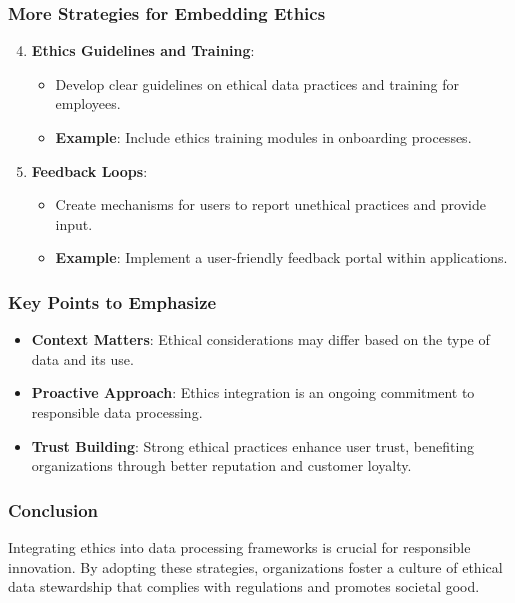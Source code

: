 \documentclass[aspectratio=169]{beamer}
\begin{document}
\begin{frame}[fragile]
    \frametitle{More Strategies for Embedding Ethics}
    \begin{enumerate}
        \setcounter{enumi}{3}
        \item \textbf{Ethics Guidelines and Training}:
            \begin{itemize}
                \item Develop clear guidelines on ethical data practices and training for employees.
                \item \textbf{Example}: Include ethics training modules in onboarding processes.
            \end{itemize}
        \item \textbf{Feedback Loops}:
            \begin{itemize}
                \item Create mechanisms for users to report unethical practices and provide input.
                \item \textbf{Example}: Implement a user-friendly feedback portal within applications.
            \end{itemize}
    \end{enumerate}
\end{frame}

\begin{frame}[fragile]
    \frametitle{Key Points to Emphasize}
    \begin{itemize}
        \item \textbf{Context Matters}: Ethical considerations may differ based on the type of data and its use.
        \item \textbf{Proactive Approach}: Ethics integration is an ongoing commitment to responsible data processing.
        \item \textbf{Trust Building}: Strong ethical practices enhance user trust, benefiting organizations through better reputation and customer loyalty.
    \end{itemize}
\end{frame}

\begin{frame}[fragile]
    \frametitle{Conclusion}
    Integrating ethics into data processing frameworks is crucial for responsible innovation. By adopting these strategies, organizations foster a culture of ethical data stewardship that complies with regulations and promotes societal good.
\end{frame}
\end{document}
